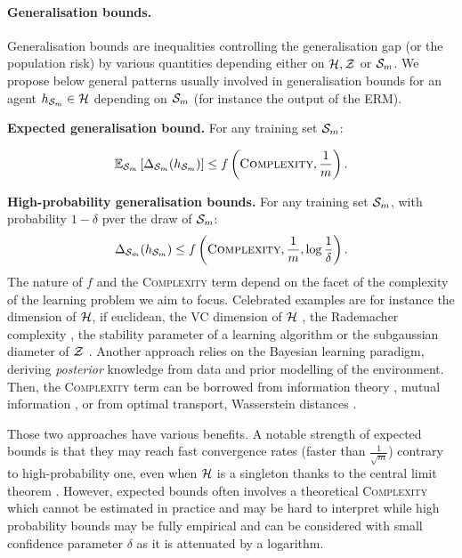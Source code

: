 \paragraph{Generalisation bounds.} Generalisation bounds are inequalities controlling the generalisation gap (or the population risk) by various quantities depending either on $\H,\Z$ or $\S_m$. We propose below general patterns usually involved in generalisation bounds for an agent $h_{\Sm}\in\H$ depending on $\S_m$ (for instance the output of the ERM). 

\textbf{Expected generalisation bound.} For any training set $\S_m$:

\begin{align} 
  \label{eq: expected-bound}
  \mathbb{E}_{\S_m}\LB \Delta_{\Sm}(h_{\Sm}) \RB \leq f\LP \textsc{Complexity}, \frac{1}{m}\RP. 
\end{align}

\textbf{High-probability generalisation bounds.} For any training set $\S_m$, with probability $1-\delta$ pver the draw of $\Sm$:
\begin{align}
  \label{eq: hp-bound}
  \Delta_{\Sm}(h_{\Sm}) \leq f\LP \textsc{Complexity}, \frac{1}{m}, \log\frac{1}{\delta}\RP.
\end{align}
The nature of $f$ and the \textsc{Complexity} term depend on the facet of the complexity of the learning problem we aim to focus. Celebrated examples are for instance the dimension of $\H$, if euclidean, the VC dimension of $\H$ \citep{vapnik2000learning}, the Rademacher complexity \citep{bartlett2001rademacher,bartlett2002rademacher},  the stability parameter of a learning algorithm \citep{bousquet2000algo} or the subgaussian diameter of $\Z$ \citep{kontorovich2014conc}. 
Another approach relies on the Bayesian learning paradigm, deriving \emph{posterior} knowledge from data and prior modelling of the environment. 
Then, the \textsc{Complexity} term can be borrowed from information theory \citep{cover2001elements}, \eg mutual information \citep{neal2012bayesian}, or from optimal transport, \eg Wasserstein distances \citep{wang2019information,rodriguez2021tighter}. 

Those two approaches have various benefits. A notable strength of expected bounds is that they may reach fast convergence rates (\ie faster than $\frac{1}{\sqrt{m}}$) contrary to high-probability one, even when $\H$ is a singleton thanks to the central limit theorem \citep{grunwald2021mac}. However, expected bounds often involves a theoretical \textsc{Complexity} which cannot be estimated in practice and may be hard to interpret while high probability bounds may be fully empirical and can be considered with small confidence parameter $\delta$ as it is attenuated by a logarithm.

